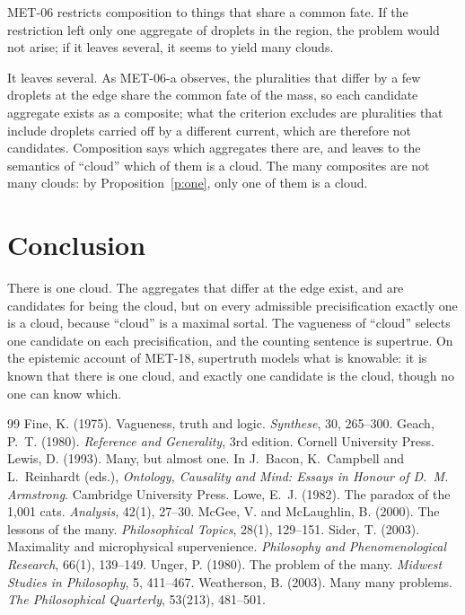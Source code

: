 \documentclass{situationist-preprint}
\begin{document}
\begin{objection}[Composition]
MET-06 restricts composition to things that share a common fate. If the restriction left only one aggregate of droplets in the region, the problem would not arise; if it leaves several, it seems to yield many clouds.
\end{objection}

\begin{reply}
It leaves several. As MET-06-a observes, the pluralities that differ by a few droplets at the edge share the common fate of the mass, so each candidate aggregate exists as a composite; what the criterion excludes are pluralities that include droplets carried off by a different current, which are therefore not candidates. Composition says which aggregates there are, and leaves to the semantics of \enquote{cloud} which of them is a cloud. The many composites are not many clouds: by Proposition~\ref{p:one}, only one of them is a cloud.
\end{reply}

\section{Conclusion}

There is one cloud. The aggregates that differ at the edge exist, and are candidates for being the cloud, but on every admissible precisification exactly one is a cloud, because \enquote{cloud} is a maximal sortal. The vagueness of \enquote{cloud} selects one candidate on each precisification, and the counting sentence is supertrue. On the epistemic account of MET-18, supertruth models what is knowable: it is known that there is one cloud, and exactly one candidate is the cloud, though no one can know which.

\begin{thebibliography}{99}\small
{} Fine, K. (1975). Vagueness, truth and logic. \emph{Synthese}, 30, 265--300.
 Geach, P.~T. (1980). \emph{Reference and Generality}, 3rd edition. Cornell University Press.
 Lewis, D. (1993). Many, but almost one. In J.~Bacon, K.~Campbell and L.~Reinhardt (eds.), \emph{Ontology, Causality and Mind: Essays in Honour of D.~M. Armstrong}. Cambridge University Press.
 Lowe, E.~J. (1982). The paradox of the 1,001 cats. \emph{Analysis}, 42(1), 27--30.
 McGee, V. and McLaughlin, B. (2000). The lessons of the many. \emph{Philosophical Topics}, 28(1), 129--151.
 Sider, T. (2003). Maximality and microphysical supervenience. \emph{Philosophy and Phenomenological Research}, 66(1), 139--149.
 Unger, P. (1980). The problem of the many. \emph{Midwest Studies in Philosophy}, 5, 411--467.
 Weatherson, B. (2003). Many many problems. \emph{The Philosophical Quarterly}, 53(213), 481--501.
\end{thebibliography}
\end{document}
